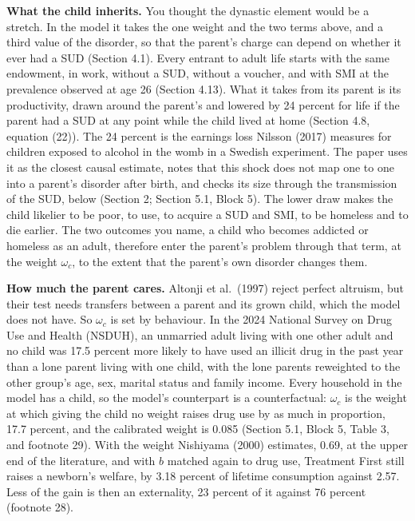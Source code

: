 \documentclass[11pt]{article}
\begin{document}
\begin{response}
\textbf{What the child inherits.} You thought the dynastic element would be a stretch. In
the model it takes the one weight and the two terms above, and a third value of the
disorder, so that the parent's charge can depend on whether it ever had a SUD (Section
4.1). Every entrant to adult life starts with the same endowment, in work, without a SUD,
without a voucher, and with SMI at the prevalence observed at age 26 (Section 4.13). What it
takes from its parent is its productivity, drawn around the parent's and lowered by 24
percent for life if the parent had a SUD at any point while the child lived at home
(Section 4.8, equation (22)). The 24 percent is the earnings loss Nilsson (2017) measures
for children exposed to alcohol in the womb in a Swedish experiment. The paper uses it as
the closest causal estimate, notes that this shock does not map one to one into a parent's
disorder after birth, and checks its size through the transmission of the SUD, below
(Section 2; Section 5.1, Block 5). The lower draw makes the child likelier to be poor, to
use, to acquire a SUD and SMI, to be homeless and to die earlier. The two outcomes you
name, a child who becomes addicted or homeless as an adult, therefore enter the parent's
problem through that term, at the weight $\omega_c$, to the extent that the parent's own
disorder changes them.

\textbf{How much the parent cares.} Altonji et al.\ (1997) reject perfect altruism, but
their test needs transfers between a parent and its grown child, which the model does not
have. So $\omega_c$ is set by behaviour. In the 2024 National Survey on Drug Use and
Health (NSDUH), an unmarried adult living with one other adult and no child was 17.5
percent more likely to have used an illicit drug in the past year than a lone parent living
with one child, with the lone parents reweighted to the other group's age, sex, marital
status and family income. Every household in the model has a child, so the model's
counterpart is a counterfactual: $\omega_c$ is the weight at which giving the child no
weight raises drug use by as much in proportion, 17.7 percent, and the calibrated weight is
0.085 (Section 5.1, Block 5, Table 3, and footnote 29). With the weight Nishiyama (2000)
estimates, 0.69, at the upper end of the literature, and with $b$ matched again to drug
use, Treatment First still raises a newborn's welfare, by 3.18 percent of lifetime
consumption against 2.57. Less of the gain is then an externality, 23 percent of it against
76 percent (footnote 28).


\end{response}
\end{document}
